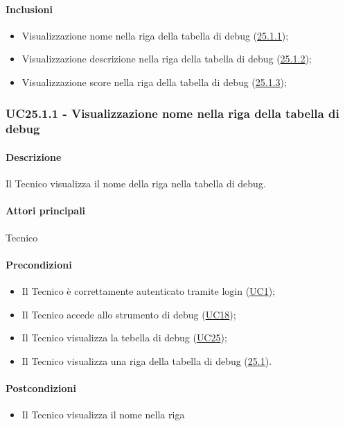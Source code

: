 \paragraph*{Inclusioni}
\begin{itemize}
    \item Visualizzazione nome nella riga della tabella di debug (\hyperref[UC25poin1point1]{25.1.1});
    \item Visualizzazione descrizione nella riga della tabella di debug (\hyperref[UC25poin1point2]{25.1.2});
    \item Visualizzazione score nella riga della tabella di debug (\hyperref[UC25poin1point3]{25.1.3});
\end{itemize}


\subsubsection{UC25.1.1 - Visualizzazione nome nella riga della tabella di debug}\label{UC25point1point1}
\paragraph*{Descrizione}
Il Tecnico visualizza il nome della riga nella tabella di debug.

\paragraph*{Attori principali}
Tecnico

\paragraph*{Precondizioni}
\begin{itemize}
  \item Il Tecnico è correttamente autenticato tramite login (\hyperref[UC1]{UC1});
  \item Il Tecnico accede allo strumento di debug (\hyperref[UC18]{UC18});
  \item Il Tecnico visualizza la tebella di debug (\hyperref[UC25]{UC25});
  \item Il Tecnico visualizza una riga della tabella di debug (\hyperref[25point1]{25.1}).
\end{itemize}

\paragraph*{Postcondizioni}
\begin{itemize}
  \item Il Tecnico visualizza il nome nella riga
\end{itemize}

